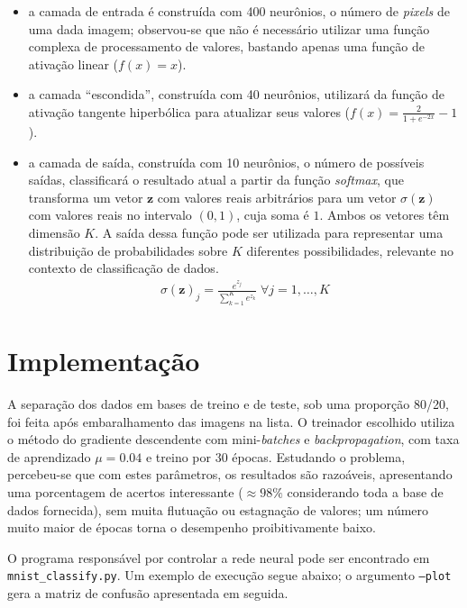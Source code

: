 \documentclass{../../sftex/sftex}
\begin{document}
\begin{itemize}
    \item a camada de entrada é construída com 400 neurônios, o número de
        \emph{pixels} de uma dada imagem; observou-se que não é necessário
        utilizar uma função complexa de processamento de valores, bastando
        apenas uma função de ativação linear ($f(x) = x$).

    \item a camada ``escondida'', construída com 40 neurônios, utilizará da
        função de ativação tangente hiperbólica para atualizar seus valores
        ($f(x) = \frac{2}{1 + e^{-2x}} -1$).

    \item a camada de saída, construída com 10 neurônios, o número de possíveis
        saídas, classificará o resultado atual a partir da função
        \emph{softmax}, que transforma um vetor $\mathbf{z}$ com valores reais
        arbitrários para um vetor $\sigma(\mathbf{z})$ com valores reais no
        intervalo $(0, 1)$, cuja soma é $1$. Ambos os vetores têm dimensão $K$.
        A saída dessa função pode ser utilizada para representar uma
        distribuição de probabilidades sobre $K$ diferentes possibilidades,
        relevante no contexto de classificação de dados.
        \begin{align*}
            \sigma{(\mathbf{z})}_j = \frac{e^{z_j}}{\sum_{k=1}^K e^{z_k}}
            \; \forall j = 1, \ldots, K
        \end{align*}
\end{itemize}

\section{Implementação}

A separação dos dados em bases de treino e de teste, sob uma proporção 80/20,
foi feita após embaralhamento das imagens na lista. O treinador escolhido
utiliza o método do gradiente descendente com mini-\emph{batches} e
\emph{backpropagation}, com taxa de aprendizado $\mu = 0.04$ e treino por $30$
épocas. Estudando o problema, percebeu-se que com estes parâmetros, os
resultados são razoáveis, apresentando uma porcentagem de acertos interessante
($\approx 98\%$ considerando toda a base de dados fornecida), sem muita
flutuação ou estagnação de valores; um número muito maior de épocas torna o
desempenho proibitivamente baixo. \medskip

O programa responsável por controlar a rede neural pode ser encontrado em
\texttt{mnist\_classify.py}. Um exemplo de execução segue abaixo; o argumento
\texttt{--plot} gera a matriz de confusão apresentada em seguida.
\end{document}
